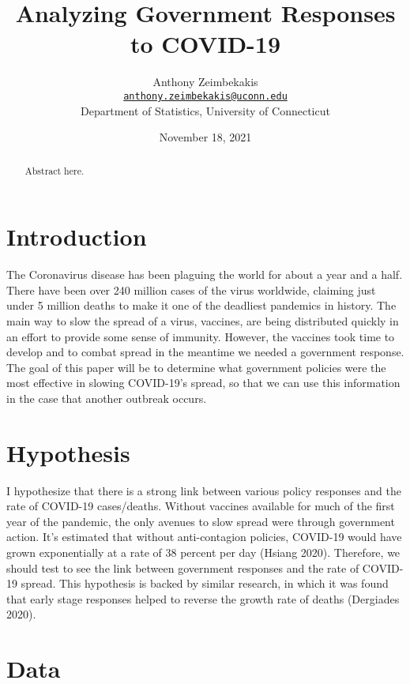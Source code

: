 \documentclass[12pt, letterpaper, titlepage]{article}
\title{Analyzing Government Responses to COVID-19}
\author{Anthony Zeimbekakis\\
\href{mailto:anthony.zeimbekakis@uconn.edu}{\nolinkurl{anthony.zeimbekakis@uconn.edu}}\\
Department of Statistics, University of Connecticut}
\date{November 18, 2021}
\begin{document}
\maketitle

\doublespace

\begin{abstract}
Abstract here.
\end{abstract}


\hypertarget{sec:intro}{%
\section{Introduction}\label{sec:intro}}

The Coronavirus disease has been plaguing the world for about a year and a half. There have been over 240 million cases of the virus worldwide, claiming just under 5 million deaths to make it one of the deadliest pandemics in history. The main way to slow the spread of a virus, vaccines, are being distributed quickly in an effort to provide some sense of immunity. However, the vaccines took time to develop and to combat spread in the meantime we needed a government response. The goal of this paper will be to determine what government policies were the most effective in slowing COVID-19’s spread, so that we can use this information in the case that another outbreak occurs.

\hypertarget{sec:litrev}{%
\section{Hypothesis}\label{sec:litrev}}

I hypothesize that there is a strong link between various policy responses and the rate of COVID-19 cases/deaths. Without vaccines available for much of the first year of the pandemic, the only avenues to slow spread were through government action. It’s estimated that without anti-contagion policies, COVID-19 would have grown exponentially at a rate of 38 percent per day (Hsiang 2020). Therefore, we should test to see the link between government responses and the rate of COVID-19 spread. This hypothesis is backed by similar research, in which it was found that early stage responses helped to reverse the growth rate of deaths (Dergiades 2020).

\hypertarget{sec:data}{%
\section{Data}\label{sec:data}}
\end{document}
